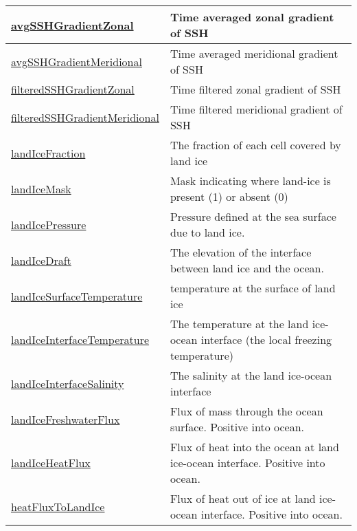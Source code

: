 {\begin{center}
\begin{longtable}{| p{2.0in} | p{4.0in} |}
    \hline
    \hyperref[subsec:var_sec_forcing_avgSSHGradientZonal]{avgSSHGradientZonal} & Time averaged zonal gradient of SSH \\
    \hline
    \hyperref[subsec:var_sec_forcing_avgSSHGradientMeridional]{avgSSHGradientMeridional} & Time averaged meridional gradient of SSH \\
    \hline
    \hyperref[subsec:var_sec_forcing_filteredSSHGradientZonal]{filteredSSHGradientZonal} & Time filtered zonal gradient of SSH \\
    \hline
    \hyperref[subsec:var_sec_forcing_filteredSSHGradientMeridional]{filteredSSHGradientMeridional} & Time filtered meridional gradient of SSH \\
    \hline
    \hyperref[subsec:var_sec_forcing_landIceFraction]{landIceFraction} & The fraction of each cell covered by land ice \\
    \hline
    \hyperref[subsec:var_sec_forcing_landIceMask]{landIceMask} & Mask indicating where land-ice is present (1) or absent (0) \\
    \hline
    \hyperref[subsec:var_sec_forcing_landIcePressure]{landIcePressure} & Pressure defined at the sea surface due to land ice. \\
    \hline
    \hyperref[subsec:var_sec_forcing_landIceDraft]{landIceDraft} & The elevation of the interface between land ice and the ocean. \\
    \hline
    \hyperref[subsec:var_sec_forcing_landIceSurfaceTemperature]{landIceSurfaceTemperature} & temperature at the surface of land ice \\
    \hline
    \hyperref[subsec:var_sec_forcing_landIceInterfaceTemperature]{landIceInterfaceTemperature} & The temperature at the land ice-ocean interface (the local freezing temperature) \\
    \hline
    \hyperref[subsec:var_sec_forcing_landIceInterfaceSalinity]{landIceInterfaceSalinity} & The salinity at the land ice-ocean interface \\
    \hline
    \hyperref[subsec:var_sec_forcing_landIceFreshwaterFlux]{landIceFreshwaterFlux} & Flux of mass through the ocean surface. Positive into ocean. \\
    \hline
    \hyperref[subsec:var_sec_forcing_landIceHeatFlux]{landIceHeatFlux} & Flux of heat into the ocean at land ice-ocean interface. Positive into ocean. \\
    \hline
    \hyperref[subsec:var_sec_forcing_heatFluxToLandIce]{heatFluxToLandIce} & Flux of heat out of ice at land ice-ocean interface. Positive into ocean. \\

\end{longtable}
\end{center}}
